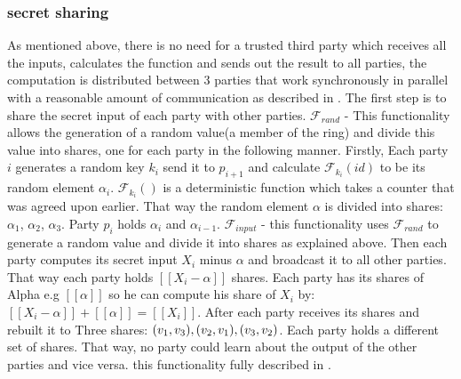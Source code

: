 \documentclass[12pt]{article}
\begin{document}
\subsubsection{secret sharing}
As mentioned above, there is no need for a trusted third party which receives all the inputs, calculates the function and sends out the result to all parties, the computation is distributed between 3 parties that work synchronously in parallel with a reasonable amount of communication as described in \cite{main_based}.
The first step is to share the secret input of each party with other parties. $\mathcal{F}_{rand}$ - This functionality allows the generation of a random value(a member of the ring) and divide this value into shares, one for each party in the following manner. Firstly, Each party $i$ generates a random key $k_i$ send it to $p_{i+1}$ and calculate $\mathcal{F}_{k_i}(id)$ to be its random element $\alpha_{i}$. $\mathcal{F}_{k_i}()$ is a deterministic function which takes a counter that was agreed upon earlier. That way the random element $\alpha$ is divided into shares: $\alpha_1$,  $\alpha_2$, $\alpha_3$. Party $p_i$ holds $\alpha_i$ and $\alpha_{i-1}$. \hfill\break
$\mathcal{F}_{input}$ - this functionality uses $\mathcal{F}_{rand}$ to generate a random value and divide it into shares as explained above. Then each party computes its secret input $X_i$ minus $\alpha$ and broadcast it to all other parties. That way each party holds $[[X_i - \alpha]]$ shares. Each party has its shares of Alpha e.g  $[[\alpha]]$ so he can compute his share of $X_i$ by: $[[X_i - \alpha]] + [[\alpha]] = [[X_i]]$.\hfill\break
After each party receives its shares and rebuilt it to Three shares: $(v_1,v_3),\hfill\break (v_2,v_1), (v_3,v_2)$. Each party holds a different set of shares. That way, no party could learn about the output of the other parties and vice versa. this functionality fully described in \cite{f_input}.
\end{document}
